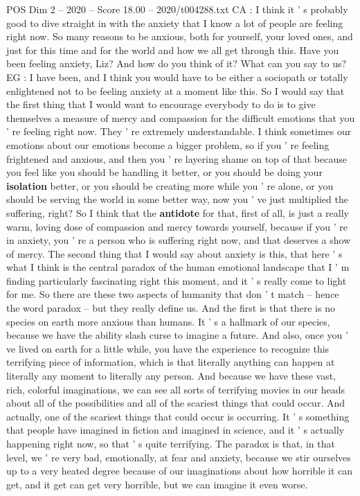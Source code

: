 \begin{textsample}{POS Dim 2 – 2020 – Score 18.00 – 2020/t004288.txt}
CA : I think it ' s probably good to dive straight in with the anxiety that I know a lot of people are feeling right now.
So many reasons to be anxious, both for yourself, your loved ones, and just for this time and for the world and how we all get through this.
Have you been feeling anxiety, Liz?
And how do you think of it?
What can you say to us?
EG : I have been, and I think you would have to be either a sociopath or totally enlightened not to be feeling anxiety at a moment like this.
So I would say that the first thing that I would want to encourage everybody to do is to give themselves a measure of mercy and compassion for the difficult emotions that you ' re feeling right now.
They ' re extremely understandable.
I think sometimes our emotions about our emotions become a bigger problem, so if you ' re feeling frightened and anxious, and then you ' re layering shame on top of that because you feel like you should be handling it better, or you should be doing your \textbf{isolation} better, or you should be creating more while you ' re alone, or you should be serving the world in some better way, now you ' ve just multiplied the suffering, right?
So I think that the \textbf{antidote} for that, first of all, is just a really warm, loving dose of compassion and mercy towards yourself, because if you ' re in anxiety, you ' re a person who is suffering right now, and that deserves a show of mercy.
The second thing that I would say about anxiety is this, that here ' s what I think is the central paradox of the human emotional landscape that I ' m finding particularly fascinating right this moment, and it ' s really come to light for me.
So there are these two aspects of humanity that don ' t match -- hence the word paradox -- but they really define us.
And the first is that there is no species on earth more anxious than humans.
It ' s a hallmark of our species, because we have the ability slash curse to imagine a future.
And also, once you ' ve lived on earth for a little while, you have the experience to recognize this terrifying piece of information, which is that literally anything can happen at literally any moment to literally any person.
And because we have these vast, rich, colorful imaginations, we can see all sorts of terrifying movies in our heads about all of the possibilities and all of the scariest things that could occur.
And actually, one of the scariest things that could occur is occurring.
It ' s something that people have imagined in fiction and imagined in science, and it ' s actually happening right now, so that ' s quite terrifying.
The paradox is that, in that level, we ' re very bad, emotionally, at fear and anxiety, because we stir ourselves up to a very heated degree because of our imaginations about how horrible it can get, and it get can get very horrible, but we can imagine it even worse.

\end{textsample}
